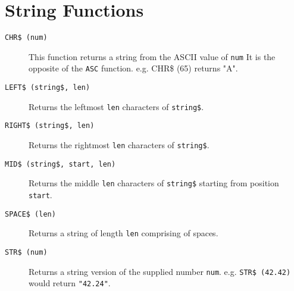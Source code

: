 \chapter{String Functions}

\begin{description}
\item[{\tt CHR\$ (num)}]
This function returns a string from the ASCII value of {\tt num} It is
the opposite of the {\tt ASC} function. e.g. CHR\$ (65) returns "A".
\item[{\tt LEFT\$ (string\$, len)}]
Returns the leftmost {\tt len} characters of {\tt string\$}.
\item[{\tt RIGHT\$ (string\$, len)}]
Returns the rightmost {\tt len} characters of {\tt string\$}.
\item[{\tt MID\$ (string\$, start, len)}]
Returns the middle {\tt len} characters of {\tt string\$}
starting from position {\tt start}. 
\item[{\tt SPACE\$ (len)}]
Returns a string of length {\tt len} comprising of spaces.
\item[{\tt STR\$ (num)}]
Returns a string version of the supplied number {\tt num}. e.g. {\tt STR\$
(42.42)} would return {\tt "42.24"}.

\end{description}
